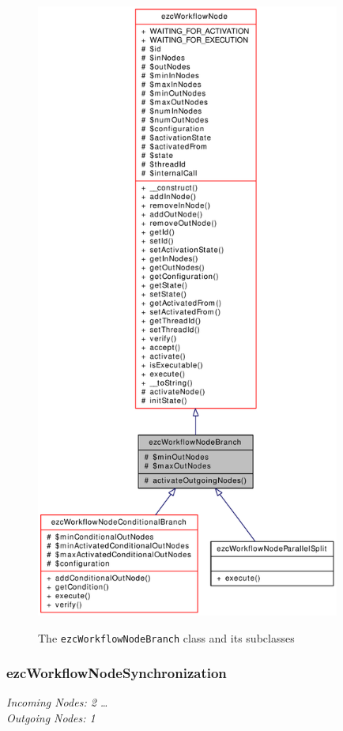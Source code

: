 \begin{figure}[hbt]
\begin{center}
\includegraphics[width=10cm]{figures/WorkflowNodeBranch}\\[5mm]
\end{center}
\caption{The \texttt{ezcWorkflowNodeBranch} class and its subclasses}
\label{classezcWorkflowNodeBranch}
\end{figure}

\subsubsection{ezcWorkflowNodeSynchronization}

\emph{Incoming Nodes: 2 \dots *}\\
\emph{Outgoing Nodes: 1}\\

